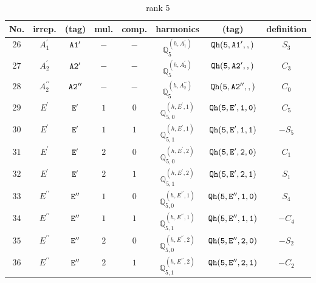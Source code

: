 \documentclass[fleqn,8pt]{jsarticle}
\begin{document}
\begin{table}[ht!]
\begin{center}
\caption{rank 5}
\renewcommand{\arraystretch}{1.3}
\begin{tabular}{cccccccc} \hline \hline
No. & irrep. & (tag) & mul. & comp. & harmonics & (tag) & definition \\ \hline
$ 26 $ & $ A_{1}^{\prime} $ & $ {\tt A1'} $ & $ - $ & $ - $ & $ \mathbb{Q}_{5}^{(h,A_{1}^{\prime})} $ & $ {\tt Qh(5,A1',,)} $ & $ S_{3} $ \\
$ 27 $ & $ A_{2}^{\prime} $ & $ {\tt A2'} $ & $ - $ & $ - $ & $ \mathbb{Q}_{5}^{(h,A_{2}^{\prime})} $ & $ {\tt Qh(5,A2',,)} $ & $ C_{3} $ \\
$ 28 $ & $ A_{2}^{\prime\prime} $ & $ {\tt A2''} $ & $ - $ & $ - $ & $ \mathbb{Q}_{5}^{(h,A_{2}^{\prime\prime})} $ & $ {\tt Qh(5,A2'',,)} $ & $ C_{0} $ \\
$ 29 $ & $ E^{\prime} $ & $ {\tt E'} $ & $ 1 $ & $ 0 $ & $ \mathbb{Q}_{5,0}^{(h,E^{\prime},1)} $ & $ {\tt Qh(5,E',1,0)} $ & $ C_{5} $ \\
$ 30 $ & $ E^{\prime} $ & $ {\tt E'} $ & $ 1 $ & $ 1 $ & $ \mathbb{Q}_{5,1}^{(h,E^{\prime},1)} $ & $ {\tt Qh(5,E',1,1)} $ & $ - S_{5} $ \\
$ 31 $ & $ E^{\prime} $ & $ {\tt E'} $ & $ 2 $ & $ 0 $ & $ \mathbb{Q}_{5,0}^{(h,E^{\prime},2)} $ & $ {\tt Qh(5,E',2,0)} $ & $ C_{1} $ \\
$ 32 $ & $ E^{\prime} $ & $ {\tt E'} $ & $ 2 $ & $ 1 $ & $ \mathbb{Q}_{5,1}^{(h,E^{\prime},2)} $ & $ {\tt Qh(5,E',2,1)} $ & $ S_{1} $ \\
$ 33 $ & $ E^{\prime\prime} $ & $ {\tt E''} $ & $ 1 $ & $ 0 $ & $ \mathbb{Q}_{5,0}^{(h,E^{\prime\prime},1)} $ & $ {\tt Qh(5,E'',1,0)} $ & $ S_{4} $ \\
$ 34 $ & $ E^{\prime\prime} $ & $ {\tt E''} $ & $ 1 $ & $ 1 $ & $ \mathbb{Q}_{5,1}^{(h,E^{\prime\prime},1)} $ & $ {\tt Qh(5,E'',1,1)} $ & $ - C_{4} $ \\
$ 35 $ & $ E^{\prime\prime} $ & $ {\tt E''} $ & $ 2 $ & $ 0 $ & $ \mathbb{Q}_{5,0}^{(h,E^{\prime\prime},2)} $ & $ {\tt Qh(5,E'',2,0)} $ & $ - S_{2} $ \\
$ 36 $ & $ E^{\prime\prime} $ & $ {\tt E''} $ & $ 2 $ & $ 1 $ & $ \mathbb{Q}_{5,1}^{(h,E^{\prime\prime},2)} $ & $ {\tt Qh(5,E'',2,1)} $ & $ - C_{2} $ \\
 \hline \hline
\end{tabular}
\end{center}
\end{table}
\end{document}
